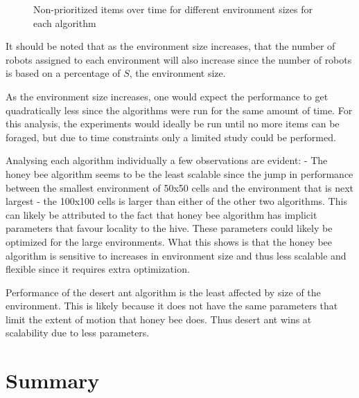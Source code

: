 \begin{figure}[!htb]
\centering
\resizebox{\textwidth}{!}{}
\caption{Non-prioritized items over time for different environment sizes for each algorithm}
\label{sizewasteplot}
\end{figure}

It should be noted that as the environment size increases, that the number of robots assigned to each environment will also increase since the number of robots is based on a percentage of $S$, the environment size.


As the environment size increases, one would expect the performance to get quadratically less since the algorithms were run for the same amount of time. For this analysis, the experiments would ideally be run until no more items can be foraged, but due to time constraints only a limited study could be performed. 

Analysing each algorithm individually a few observations are evident:
- The honey bee algorithm seems to be the least scalable since the jump in performance between the smallest environment of 50x50 cells and the environment that is next largest - the 100x100 cells is larger than either of the other two algorithms. This can likely be attributed to the fact that honey bee algorithm has implicit parameters that favour locality to the hive. These parameters could likely be optimized for the large environments. What this shows is that the honey bee algorithm is sensitive to increases in environment size and thus less scalable and flexible since it requires extra optimization.  

Performance of the desert ant algorithm is the least affected by size of the environment. This is likely because it does not have the same parameters that limit the extent of motion that honey bee does. 
Thus desert ant wins at scalability due to less parameters. 

\section{Summary}
\label{results:summary}

